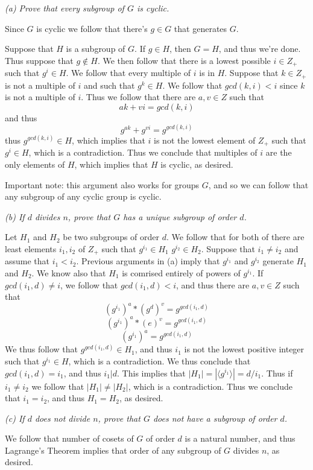 \documentclass[11pt,oneside,titlepage]{book}
\newcommand{\eangle}[1]{\langle #1 \rangle}
\begin{document}
\textit{(a) Prove that every subgroup of $G$ is cyclic.}

Since $G$ is cyclic we follow that there's $g \in G$ that generates
$G$.

Suppose that $H$ is a subgroup of $G$. If $g \in H$, then $G = H$, and
thus we're done. Thus suppose that $g \notin H$. We then follow that
there is a lowest possible $i \in Z_+$ such that $g^i \in H$. We
follow that every multiple of $i$ is in $H$. Suppose that $k \in Z_+$
is not a multiple of $i$ and such that $g^k \in H$. We follow that
$gcd(k, i) < i$ since $k$ is not a multiple of $i$. Thus we follow
that there are $a, v \in Z$ such that
$$ak + vi = gcd(k, i)$$
and thus
$$g^{ak} + g^{vi} = g^{gcd(k, i)}$$
thus $g^{gcd(k, i)} \in H$, which implies that $i$ is not the lowest
element of $Z_+$ such that $g^i \in H$, which is a contradiction. Thus
we conclude that multiples of $i$ are the only elements of $H$, which
implies that $H$ is cyclic, as desired.

Important note: this argument also works for groups $G$, and so we can
follow that any subgroup of any cyclic group is cyclic.

\textit{(b) If $d$ divides $n$, prove that $G$ has a unique subgroup
of order $d$.}

Let $H_1$ and $H_2$ be two subgroups of order $d$. We follow that for
both of there are least elements $i_1, i_2$ of $Z_+$ such that
$g^{i_1} \in H_1$ $g^{i_2} \in H_2$. Suppose that $i_1 \neq i_2$ and
assume that $i_1 < i_2$.  Previous arguments in (a) imply that
$g^{i_1}$ and $g^{i_2}$ generate $H_1$ and $H_2$. We know also that
$H_1$ is comrised entirely of powers of $g^{i_1}$. If $gcd(i_1, d)
\neq i$, we follow that $gcd(i_1, d) < i$, and thus there are $a, v
\in Z$ such that
$$(g^{i_1})^a * (g^{d})^v = g^{gcd(i_1, d)}$$
$$(g^{i_1})^a * (e)^v = g^{gcd(i_1, d)}$$
$$(g^{i_1})^a  = g^{gcd(i_1, d)}$$
We thus follow that $g^{gcd(i_1, d)} \in H_1$, and thus $i_1$ is not
the lowest positive integer such that $g^{i_1} \in H$, which is a
contradiction. We thus conclude that $gcd(i_1, d) = i_1$, and thus
$i_1 | d$. This implies that $|H_1| = |\eangle{g^{i_1}}| = d / i_1$.
Thus if $i_1 \neq i_2$ we follow that $|H_1| \neq |H_2|$, which is a
contradiction. Thus we conclude that $i_1 = i_2$, and thus $H_1 =
H_2$, as desired.

\textit{(c) If $d$ does not divide $n$, prove that $G$ does not have a
subgroup of order $d$.}

We follow that number of cosets of $G$ of order $d$ is a natural
number, and thus Lagrange's Theorem implies that order of any subgroup
of $G$ divides $n$, as desired.
\end{document}
